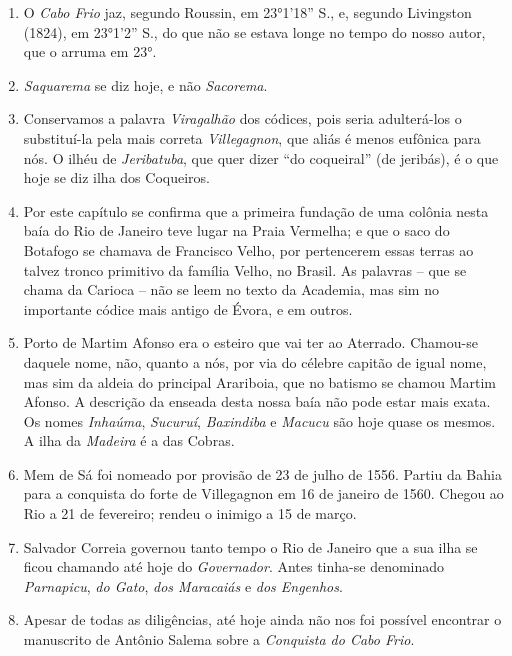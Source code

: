 \begin{enumerate}
\item O \textit{Cabo Frio} jaz, segundo Roussin, em 23°1'18'' S., e, segundo Livingston (1824), 
em 23°1'2'' S., do que não se estava longe no tempo do nosso autor, que o arruma em 
23°. 

\item \textit{Saquarema} se diz hoje, e não \textit{Sacorema}.

\item Conservamos a palavra \textit{Viragalhão} dos códices, pois seria adulterá-los o 
substituí-la pela mais correta \textit{Villegagnon}, que aliás é menos eufônica para nós. 
O ilhéu de  \textit{Jeribatuba}, que quer dizer ``do coqueiral'' (de jeribás),
é o que hoje se diz ilha dos Coqueiros.

\item Por este capítulo se confirma que a primeira fundação de uma colônia nesta baía  
do Rio de Janeiro teve lugar na Praia Vermelha; e que o saco do Botafogo se chamava 
de Francisco Velho, por pertencerem essas terras ao  talvez tronco  primitivo da 
família Velho, no Brasil.
As palavras -- que se chama da Carioca -- não se leem no texto da Academia, mas 
sim no importante códice mais antigo de Évora, e em outros.

\item  Porto de Martim Afonso era o esteiro que vai ter ao Aterrado.
Chamou-se daquele nome, não, quanto a nós, por via do célebre capitão de
igual nome, mas sim da aldeia do principal Arariboia, que no batismo se
chamou Martim Afonso.
A descrição da enseada desta nossa baía não pode estar mais exata. Os nomes  
\textit{Inhaúma}, \textit{Sucuruí}, \textit{Baxindiba} e \textit{Macucu}  são hoje quase os mesmos. A ilha da \textit{Madeira} é a 
das Cobras.

\item Mem de Sá foi nomeado por provisão de 23 de julho de 1556. Partiu da Bahia para a 
conquista do forte de Villegagnon em 16 de janeiro de 1560. Chegou ao Rio a 21 de 
fevereiro; rendeu o inimigo a 15 de março.

\item Salvador Correia governou tanto tempo o Rio de Janeiro que a sua ilha se ficou 
chamando até hoje do \textit{Governador}. Antes tinha-se denominado \textit{Parnapicu}, 
\textit{do Gato}, \textit{dos Maracaiás} e \textit{dos Engenhos}.

\item Apesar de todas as diligências, até hoje ainda não nos foi possível encontrar o 
manuscrito de Antônio Salema sobre a \textit{Conquista do Cabo Frio}.


\end{enumerate}
